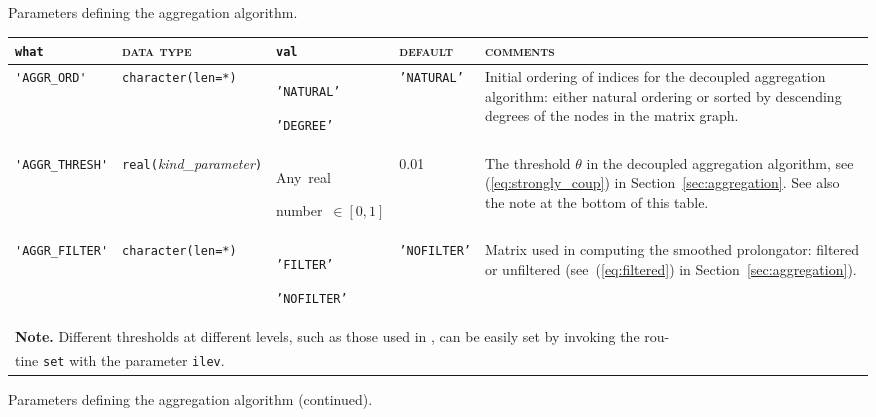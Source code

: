 \caption{Parameters defining the aggregation algorithm.
\label{tab:p_aggregation}}
\esideways

\bsideways
\begin{center}
\begin{tabular}{|p{3.8cm}|l|p{2.5cm}|p{2.3cm}|p{6.6cm}|}
\hline
\verb|what|              & \textsc{data type}        &  \verb|val|      &  \textsc{default}  &
\textsc{comments} \\ \hline

\verb|'AGGR_ORD'|  & \verb|character(len=*)|
                         & \texttt{'NATURAL'} \par \texttt{'DEGREE'}
                         & \texttt{'NATURAL'}
                         & Initial ordering of indices for the decoupled aggregation
                            algorithm: either natural ordering or sorted by
                            descending degrees of the nodes in the
                            matrix graph. \\ \hline

\verb|'AGGR_THRESH'| & \verb|real(|\emph{kind\_parameter}\verb|)|
                         & Any~real \par number~$\in [0, 1]$
                         & 0.01
                         & The threshold $\theta$ in the decoupled aggregation algorithm,
                            see (\ref{eq:strongly_coup}) in Section~\ref{sec:aggregation}.
                            See also the note at the bottom of this table. \\ \hline
\verb|'AGGR_FILTER'|
                         & \verb|character(len=*)|
                         & \texttt{'FILTER'} \par \texttt{'NOFILTER'}
                        & \texttt{'NOFILTER'} & Matrix used in computing the smoothed
                           prolongator: filtered or unfiltered (see~(\ref{eq:filtered}) in Section~\ref{sec:aggregation}). \\
\hline
\multicolumn{5}{|l|}{{\bfseries Note.} Different thresholds at different levels, such as
those used in \cite[Section~5.1]{VANEK_MANDEL_BREZINA}, can be easily set  by
invoking the rou-} \\
\multicolumn{5}{|l|}{tine \texttt{set} with
the parameter \texttt{ilev}.} \\
\hline
\end{tabular}
\end{center}
\caption{Parameters defining the aggregation algorithm (continued).
\label{tab:p_aggregation_1}}
\esideways

